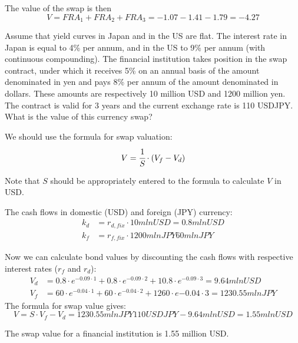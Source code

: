 \documentclass[12pt,a4paper]{exam}
\begin{document}
\begin{questions}
\begin{solution}
The value of the swap is then 
\begin{equation*}
V=FRA_1+FRA_2+FRA_3 = -1.07-1.41-1.79=-4.27
\end{equation*}
\end{solution}

\question Assume that yield curves in Japan and in the US are flat. The interest rate in Japan is equal to 4\% per annum, and in the US to 9\% per annum (with continuous compounding). The financial institution takes position in the swap contract, under which it receives 5\% on an annual basis of the amount denominated in yen and pays 8\% per annum of the amount denominated in dollars. These amounts are respectively 10 million USD and 1200 million yen. The contract is valid for 3 years and the current exchange rate is 110 USDJPY. What is the value of this currency swap?
\begin{solution}
We should use the formula for swap valuation: 
\begin{equation*}
V=\cfrac{1}{S}\cdot(V_f-V_d)
\end{equation*}

Note that $S$ should be appropriately entered to the formula to calculate $V$ in USD.

The cash flows in domestic (USD) and foreign (JPY) currency:
\begin{equation*}
\begin{aligned}
k_d&=r_{d, fix}\cdot 10 mln USD =0.8 mln USD \\
k_f&=r_{f, fix}\cdot 1200 mln JPY 60 mln JPY
\end{aligned}
\end{equation*}

Now we can calculate bond values by discounting the cash flows with respective interest rates ($r_f$ and $r_d$):
\begin{equation*}
\begin{aligned}
V_d&=0.8\cdot e^{-0.09\cdot1}+0.8\cdot e^{-0.09\cdot2}+10.8\cdot e^{-0.09\cdot 3}=9.64 mln USD\\
V_f&=60\cdot e^{-0.04\cdot1}+60\cdot e^{-0.04\cdot 2}+1260\cdot e{-0.04\cdot 3}=1230.55 mln JPY
\end{aligned}
\end{equation*}
The formula for swap value gives:
\begin{equation*}
V = S\cdot V_f - V_d =1230.55 mln JPY110 USDJPY-9.64 mln USD=1.55 mln USD
\end{equation*}

The swap value for a financial institution is 1.55 million USD.
\end{solution}


\end{questions}
\end{document}
